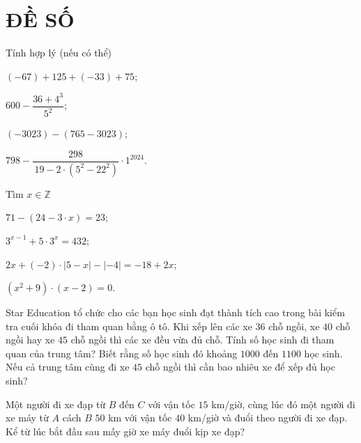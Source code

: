 \section{ĐỀ SỐ \thesection} %
\setcounter{bt}{0}

\begin{bt}  Tính hợp lý (nếu có thể)
	\begin{listEX}[2]
		\item  $(-67)+125+(-33)+75$;
		\item $600- \dfrac{36+4^3}{5^2} $;
		\item $(-3023)-\left(765-3023\right)$;
		\item $798-\dfrac{298}{\,19-2\cdot\left(5^2-22^2\right)}\cdot 1^{2024}$.
	\end{listEX}
\end{bt}

\begin{bt}  Tìm $x\in \mathbb{Z}$
	\begin{listEX}[2]
		\item  $71-\left(24-3\cdot x\right)=23$;
		\item $3^{x-1}+5\cdot 3^x=432$;
		\item $2x+(-2)\cdot\left|5-x\right|-|-4|=-18+2x$;
		\item $\left(x^2+9\right)\cdot\left(x-2\right)=0$.
	\end{listEX}
\end{bt}

\begin{bt} 
	Star Education tổ chức cho các bạn học sinh đạt thành tích cao trong bài kiểm tra cuối khóa đi tham quan bằng ô tô. Khi xếp lên các xe $36$ chỗ ngồi, xe $40$ chỗ ngồi hay xe $45$ chỗ ngồi thì các xe đều vừa đủ chỗ. Tính số học sinh đi tham quan của trung tâm? Biết rằng số học sinh đó khoảng $1000$ đến $1100$ học sinh. Nếu cả trung tâm cùng đi xe $45$ chỗ ngồi thì cần bao nhiêu xe để xếp đủ học sinh?
\end{bt}

\begin{bt} 
	Một người đi xe đạp từ $B$ đến $C$ với vận tốc $15$ km/giờ, cùng lúc đó một người đi xe máy từ $A$ cách $B$ $50$ km với vận tốc $40$ km/giờ và đuổi theo người đi xe đạp. Kể từ lúc bắt đầu sau mấy giờ xe máy đuổi kịp xe đạp?
\end{bt}

